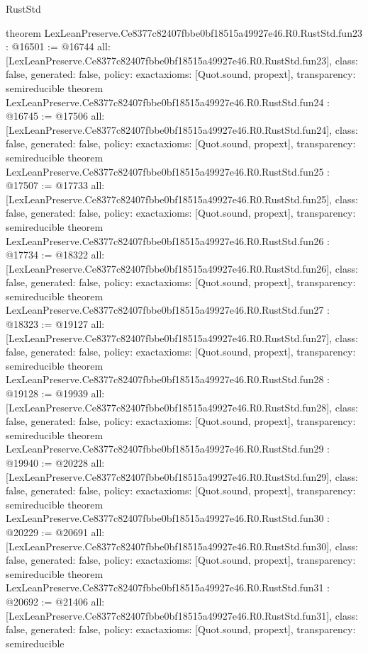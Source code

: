 \begin{lexlean}{RustStd}
\begin{coremodule}
{}
theorem LexLeanPreserve.Ce8377c82407fbbe0bf18515a49927e46.R0.RustStd.fun23 : @16501 := @16744 {
  all: [LexLeanPreserve.Ce8377c82407fbbe0bf18515a49927e46.R0.RustStd.fun23],
  class: false,
  generated: false,
  policy: exact{axioms: [Quot.sound, propext]},
  transparency: semireducible
}
theorem LexLeanPreserve.Ce8377c82407fbbe0bf18515a49927e46.R0.RustStd.fun24 : @16745 := @17506 {
  all: [LexLeanPreserve.Ce8377c82407fbbe0bf18515a49927e46.R0.RustStd.fun24],
  class: false,
  generated: false,
  policy: exact{axioms: [Quot.sound, propext]},
  transparency: semireducible
}
theorem LexLeanPreserve.Ce8377c82407fbbe0bf18515a49927e46.R0.RustStd.fun25 : @17507 := @17733 {
  all: [LexLeanPreserve.Ce8377c82407fbbe0bf18515a49927e46.R0.RustStd.fun25],
  class: false,
  generated: false,
  policy: exact{axioms: [Quot.sound, propext]},
  transparency: semireducible
}
theorem LexLeanPreserve.Ce8377c82407fbbe0bf18515a49927e46.R0.RustStd.fun26 : @17734 := @18322 {
  all: [LexLeanPreserve.Ce8377c82407fbbe0bf18515a49927e46.R0.RustStd.fun26],
  class: false,
  generated: false,
  policy: exact{axioms: [Quot.sound, propext]},
  transparency: semireducible
}
theorem LexLeanPreserve.Ce8377c82407fbbe0bf18515a49927e46.R0.RustStd.fun27 : @18323 := @19127 {
  all: [LexLeanPreserve.Ce8377c82407fbbe0bf18515a49927e46.R0.RustStd.fun27],
  class: false,
  generated: false,
  policy: exact{axioms: [Quot.sound, propext]},
  transparency: semireducible
}
theorem LexLeanPreserve.Ce8377c82407fbbe0bf18515a49927e46.R0.RustStd.fun28 : @19128 := @19939 {
  all: [LexLeanPreserve.Ce8377c82407fbbe0bf18515a49927e46.R0.RustStd.fun28],
  class: false,
  generated: false,
  policy: exact{axioms: [Quot.sound, propext]},
  transparency: semireducible
}
theorem LexLeanPreserve.Ce8377c82407fbbe0bf18515a49927e46.R0.RustStd.fun29 : @19940 := @20228 {
  all: [LexLeanPreserve.Ce8377c82407fbbe0bf18515a49927e46.R0.RustStd.fun29],
  class: false,
  generated: false,
  policy: exact{axioms: [Quot.sound, propext]},
  transparency: semireducible
}
theorem LexLeanPreserve.Ce8377c82407fbbe0bf18515a49927e46.R0.RustStd.fun30 : @20229 := @20691 {
  all: [LexLeanPreserve.Ce8377c82407fbbe0bf18515a49927e46.R0.RustStd.fun30],
  class: false,
  generated: false,
  policy: exact{axioms: [Quot.sound, propext]},
  transparency: semireducible
}
theorem LexLeanPreserve.Ce8377c82407fbbe0bf18515a49927e46.R0.RustStd.fun31 : @20692 := @21406 {
  all: [LexLeanPreserve.Ce8377c82407fbbe0bf18515a49927e46.R0.RustStd.fun31],
  class: false,
  generated: false,
  policy: exact{axioms: [Quot.sound, propext]},
  transparency: semireducible
}
\end{coremodule}
\end{lexlean}
